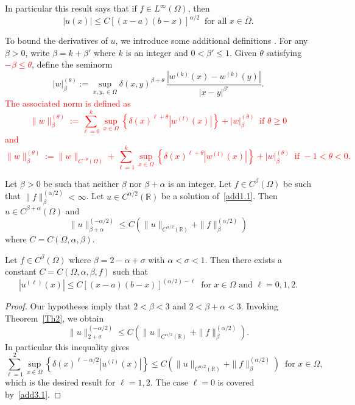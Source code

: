 \documentclass[smallextended]{svjour3}       %
\newcommand{\tcr}[1]{\textcolor{red}{#1}}
\begin{document}
In particular this result says that if  $f\in L^\infty(\Omega)$, then
\begin{equation}\label{add3.1}
	|u(x)| \le C [(x-a)(b-x)]^{\alpha/2}\  \text{ for all } x\in\bar\Omega.
\end{equation}

To bound the derivatives of $u$, we introduce some additional definitions \tcr{\cite{RosOtonSerra:14}}. For any $\beta>0$, write $\beta  = k + \beta'$ where $k$ is an integer
and $0 < \beta' \le 1$. Given $\theta$ satisfying  \tcr{ $ -\beta\le \theta$}, define the seminorm
\[
|w|_\beta^{(\theta)} := \sup_{x,y,\in\Omega} \delta(x,y)^{\beta+\theta} \, \frac{\left|w^{(k)}(x) - w^{(k)}(y)\right|}{|x-y|^{\beta'}}.
\]
\tcr{The associated norm is defined as
\[
\|w\|_\beta^{(\theta)} := 
 \sum_{\ell=0}^k \sup_{x\in\Omega} 
\left\{ \delta(x)^{\ell+\theta} \left|w^{(l)}(x)\right|\right\} + |w|_\beta^{(\theta)}\ \text{ if } \theta\geq 0
\]
and  
\[
\|w\|_\beta^{(\theta)} := 
 \|w\|_{C^{-\theta}(\Omega)} + \sum_{\ell=1}^k \sup_{x\in\Omega} 
\left\{ \delta(x)^{\ell+\theta} \left|w^{(l)}(x)\right|\right\} + |w|_\beta^{(\theta)} \ \text{ if }-1<\theta<0.
\]
}

\begin{theorem}\label{Th2}\cite[Proposition~1.4]{RosOtonSerra:14}
	Let $\beta>0$ be such that neither $\beta$ nor $\beta+\alpha$ is an integer.
	Let $f\in C^\beta(\Omega)$ be such that $\|f\|_\beta^{(\alpha/2)}<\infty$. Let $u\in C^{\alpha/2}(\mathbb{R})$ be a solution of~\eqref{add1.1}.
	Then $u\in C^{\beta + \alpha}(\Omega)$ and
	\[
	\|u\|_{\beta + \alpha}^{(-\alpha/2)} \le C \left(\|u\|_{C^{\alpha/2}(\mathbb{R})} + \|f\|_\beta^{(\alpha/2)}  \right)
	\]
	where $C = C(\Omega, \alpha, \beta)$.
\end{theorem}

\begin{corollary}\label{cor:ubounds}
	Let $f\in C^\beta(\Omega)$ where  $\beta = 2-\alpha+\sigma$ with $\alpha < \sigma < 1$.
	Then there exists a constant  $C= C(\Omega, \alpha, \beta, f)$ such that
	\[
	\left|u^{(\ell)}(x)\right|\le C[(x-a)(b-x)]^{(\alpha/2)-\ell} \ \text{ for } x\in\Omega \text{ and } \ell=0,1,2.
	\]
\end{corollary}
\begin{proof}
	Our hypotheses imply that  $2<\beta<3$ and $2<\beta+\alpha<3$.
	Invoking Theorem~\ref{Th2}, we obtain
	\[
	\|u\|_{2+\sigma}^{(-\alpha/2)} \le C \left(\|u\|_{C^{\alpha/2}(\mathbb{R})} + \|f\|_\beta^{(\alpha/2)}  \right).
	\]
	In particular this inequality gives
	\[
	\sum_{\ell=1}^2 \sup_{x\in\Omega} \left\{ \delta(x)^{\ell-\alpha/2} \left|u^{(l)}(x)\right|\right\}
	\le C \left(\|u\|_{C^{\alpha/2}(\mathbb{R})} + \|f\|_\beta^{(\alpha/2)}  \right)
	\ \text{ for } x\in\Omega,
	\]
	which is the desired result for $\ell=1,2$. The case $\ell=0$ is covered by~\eqref{add3.1}.
\end{proof}
\end{document}
